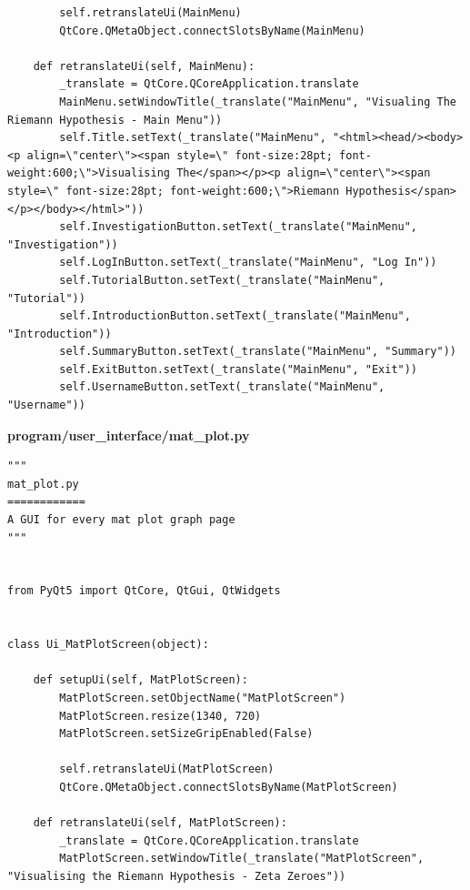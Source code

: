 \documentclass{article}
\begin{document}
\begin{lstlisting}
        self.retranslateUi(MainMenu)
        QtCore.QMetaObject.connectSlotsByName(MainMenu)

    def retranslateUi(self, MainMenu):
        _translate = QtCore.QCoreApplication.translate
        MainMenu.setWindowTitle(_translate("MainMenu", "Visualing The Riemann Hypothesis - Main Menu"))
        self.Title.setText(_translate("MainMenu", "<html><head/><body><p align=\"center\"><span style=\" font-size:28pt; font-weight:600;\">Visualising The</span></p><p align=\"center\"><span style=\" font-size:28pt; font-weight:600;\">Riemann Hypothesis</span></p></body></html>"))
        self.InvestigationButton.setText(_translate("MainMenu", "Investigation"))
        self.LogInButton.setText(_translate("MainMenu", "Log In"))
        self.TutorialButton.setText(_translate("MainMenu", "Tutorial"))
        self.IntroductionButton.setText(_translate("MainMenu", "Introduction"))
        self.SummaryButton.setText(_translate("MainMenu", "Summary"))
        self.ExitButton.setText(_translate("MainMenu", "Exit"))
        self.UsernameButton.setText(_translate("MainMenu", "Username"))
\end{lstlisting}

\clearpage
\textbf{program/user\_interface/mat\_plot.py}
\begin{lstlisting}
"""
mat_plot.py
============
A GUI for every mat plot graph page
"""


from PyQt5 import QtCore, QtGui, QtWidgets


class Ui_MatPlotScreen(object):

    def setupUi(self, MatPlotScreen):
        MatPlotScreen.setObjectName("MatPlotScreen")
        MatPlotScreen.resize(1340, 720)
        MatPlotScreen.setSizeGripEnabled(False)

        self.retranslateUi(MatPlotScreen)
        QtCore.QMetaObject.connectSlotsByName(MatPlotScreen)

    def retranslateUi(self, MatPlotScreen):
        _translate = QtCore.QCoreApplication.translate
        MatPlotScreen.setWindowTitle(_translate("MatPlotScreen", "Visualising the Riemann Hypothesis - Zeta Zeroes"))
\end{lstlisting}
\end{document}
